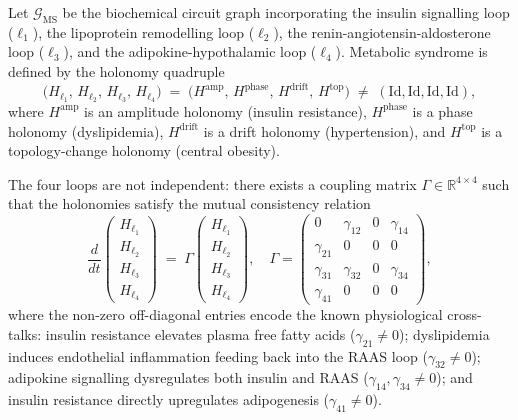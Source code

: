 \begin{definition}
\label{def:ch11-ms-quadruple}
Let $\mathcal{G}_{\mathrm{MS}}$ be the biochemical circuit graph incorporating
the insulin signalling loop ($\ell_1$), the lipoprotein remodelling loop
($\ell_2$), the renin-angiotensin-aldosterone loop ($\ell_3$), and the
adipokine-hypothalamic loop ($\ell_4$).  Metabolic syndrome is defined by
the holonomy quadruple
\[
  \bigl(H_{\ell_1},\, H_{\ell_2},\, H_{\ell_3},\, H_{\ell_4}\bigr)
  \;=\;
  \bigl(H^{\mathrm{amp}},\, H^{\mathrm{phase}},\, H^{\mathrm{drift}},\,
  H^{\mathrm{top}}\bigr)
  \;\neq\;
  (\mathrm{Id}, \mathrm{Id}, \mathrm{Id}, \mathrm{Id}),
\]
where $H^{\mathrm{amp}}$ is an amplitude holonomy (insulin resistance),
$H^{\mathrm{phase}}$ is a phase holonomy (dyslipidemia), $H^{\mathrm{drift}}$
is a drift holonomy (hypertension), and $H^{\mathrm{top}}$ is a topology-change
holonomy (central obesity).
\end{definition}

The four loops are not independent: there exists a coupling matrix
$\Gamma \in \mathbb{R}^{4 \times 4}$ such that the holonomies satisfy the
mutual consistency relation
\begin{equation}
\label{eq:ch11-ms-coupling}
  \frac{d}{dt}
  \begin{pmatrix} H_{\ell_1} \\ H_{\ell_2} \\ H_{\ell_3} \\ H_{\ell_4}
  \end{pmatrix}
  \;=\;
  \Gamma
  \begin{pmatrix} H_{\ell_1} \\ H_{\ell_2} \\ H_{\ell_3} \\ H_{\ell_4}
  \end{pmatrix},
  \quad
  \Gamma = \begin{pmatrix}
    0 & \gamma_{12} & 0           & \gamma_{14} \\
    \gamma_{21} & 0 & 0           & 0           \\
    \gamma_{31} & \gamma_{32} & 0 & \gamma_{34} \\
    \gamma_{41} & 0           & 0 & 0
  \end{pmatrix},
\end{equation}
where the non-zero off-diagonal entries encode the known physiological
cross-talks: insulin resistance elevates plasma free fatty acids
($\gamma_{21} \neq 0$); dyslipidemia induces endothelial inflammation
feeding back into the RAAS loop ($\gamma_{32} \neq 0$); adipokine signalling
dysregulates both insulin and RAAS ($\gamma_{14}, \gamma_{34} \neq 0$);
and insulin resistance directly upregulates adipogenesis
($\gamma_{41} \neq 0$).

